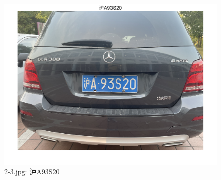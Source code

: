 \documentclass[utf8,a4paper]{ctexart}
\begin{document}
\begin{appendices}
    \begin{minipage}{0.44\linewidth}
        \begin{figure}[H]
            \center
            \includegraphics[width=\linewidth]{../result/medium/2-3.png}
            \caption{2-3.jpg: 沪A93S20} 
        \end{figure}
    \end{minipage}
    \hfill
    \begin{minipage}{0.44\linewidth}
        
    \end{minipage}
    \par



\end{appendices}
\end{document}
